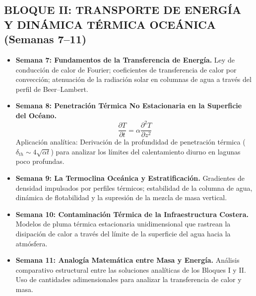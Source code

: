 \subsection{BLOQUE II: TRANSPORTE DE ENERGÍA Y DINÁMICA TÉRMICA OCEÁNICA (Semanas 7–11)}
\begin{itemize}
    \item \textbf{Semana 7: Fundamentos de la Transferencia de Energía.} Ley de conducción de calor de Fourier;
coeficientes de transferencia de calor por convección; atenuación de la radiación solar en columnas de agua a través del perfil de Beer--Lambert.
\item \textbf{Semana 8: Penetración Térmica No Estacionaria en la Superficie del Océano.}
    \begin{equation*}
        \frac{\partial T}{\partial t} = \alpha \frac{\partial^2 T}{\partial z^2}
    \end{equation*}
    Aplicación analítica: Derivación de la profundidad de penetración térmica ($\delta_{th} \sim 4\sqrt{\alpha t}$) para analizar los límites del calentamiento diurno en lagunas poco profundas.
\item \textbf{Semana 9: La Termoclina Oceánica y Estratificación.} Gradientes de densidad impulsados por perfiles térmicos;
estabilidad de la columna de agua, dinámica de flotabilidad y la supresión de la mezcla de masa vertical.
\item \textbf{Semana 10: Contaminación Térmica de la Infraestructura Costera.} Modelos de pluma térmica estacionaria unidimensional que rastrean la disipación de calor a través del límite de la superficie del agua hacia la atmósfera.
\item \textbf{Semana 11: Analogía Matemática entre Masa y Energía.} Análisis comparativo estructural entre las soluciones analíticas de los Bloques I y II.
Uso de cantidades adimensionales para analizar la transferencia de calor y masa.
\end{itemize}

